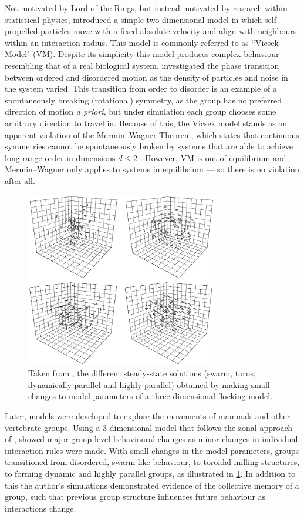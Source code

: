 Not motivated by Lord of the Rings, but instead motivated by research within statistical physics, \citet{vicsek95} introduced a simple two-dimensional model in which self-propelled particles move with a fixed absolute velocity and align with neighbours within an interaction radius. This model is commonly referred to as ``Vicsek Model" (VM). Despite its simplicity this model produces complex behaviour resembling that of a real biological system. \citet{vicsek95} investigated the phase transition between ordered and disordered motion as the density of particles and noise in the system varied. This transition from order to disorder is an example of a spontaneously breaking (rotational) symmetry, as the group has no preferred direction of motion \emph{a priori}, but under simulation each group chooses some arbitrary direction to travel in. Because of this, the Vicsek model stands as an apparent violation of the Mermin--Wagner Theorem, which states that continuous symmetries cannot be spontaneously broken by systems that are able to achieve long range order in dimensions $d\leq 2$ \citep{mermin66}. However, VM is out of equilibrium and Mermin--Wagner only applies to systems in equilibrium --- so there is no violation after all.

\begin{figure}[t]
	\includegraphics[width=0.75\textwidth]{couzin.png}
	\caption{Taken from \citet{couzin02}, the different steady-state solutions (swarm, torus, dynamically parallel and highly parallel) obtained by making small changes to model parameters of a three-dimensional flocking model.}
	\label{fig:couzin}
\end{figure}

Later, models were developed to explore the movements of mammals and other vertebrate groups. Using a 3-dimensional model that follows the zonal approach of \citet{aoki82}, \citet{couzin02} showed major group-level behavioural changes as minor changes in individual interaction rules were made. With small changes in the model parameters, groups transitioned from disordered, swarm-like behaviour, to toroidal milling structures, to forming dynamic and highly parallel groups, as illustrated in \cref{fig:couzin}. In addition to this the author's simulations demonstrated evidence of the collective memory of a group, such that previous group structure influences future behaviour as interactions change.

